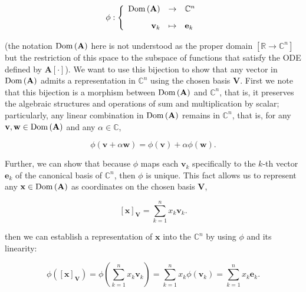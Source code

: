 \begin{equation} \phi: \left\{\begin{array}{rcl} \operatorname{Dom}\left(\mathbf{A}\right) &\to& \mathbb{C}^n \\[3mm] \mathbf{v}_k &\mapsto& \mathbf{e}_k \end{array}\right. \end{equation}

	\noindent (the notation $\operatorname{Dom}\left(\mathbf{A}\right)$ here is not understood as the proper domain $\left[\mathbb{R}\to\mathbb{C}^n\right]$ but the restriction of this space to the subspace of functions that satisfy the ODE defined by $\mathbf{A}\left[\cdot\right]$). We want to use this bijection to show that any vector in $\operatorname{Dom}\left(\mathbf{A}\right)$ admits a representation in $\mathbb{C}^n$ using the chosen basis $\mathbf{V}$. First we note that this bijection is a morphism between $\operatorname{Dom}\left(\mathbf{A}\right)$ and $\mathbb{C}^n$, that is, it preserves the algebraic structures and operations of sum and multiplication by scalar; particularly, any linear combination in $\operatorname{Dom}\left(\mathbf{A}\right)$ remains in $\mathbb{C}^n$, that is, for any $\mathbf{v},\mathbf{w}\in\operatorname{Dom}\left(\mathbf{A}\right)$ and any $\alpha\in\mathbb{C}$,

\begin{equation} \phi\left(\mathbf{v} + \alpha\mathbf{w}\right) = \phi\left(\mathbf{v}\right) + \alpha\phi\left(\mathbf{w}\right) .\end{equation}

	Further, we can show that because $\phi$ maps each $\mathbf{v}_k$ specifically to the $k$-th vector $\mathbf{e}_k$ of the canonical basis of $\mathbb{C}^n$, then $\phi$ is unique. This fact allows us to represent any $\mathbf{x}\in\operatorname{Dom}\left(\mathbf{A}\right)$ as coordinates on the chosen basis $\mathbf{V}$,

\begin{equation} \left[\mathbf{x}\right]_{\mathbf{V}} = \sum\limits_{k=1}^n x_k \mathbf{v}_k .\end{equation}

	\noindent then we can establish a representation of $\mathbf{x}$ into the $\mathbb{C}^n$ by using $\phi$ and its linearity:

\begin{equation} \phi\left(\left[\mathbf{x}\right]_{\mathbf{V}}\right) = \phi\left(\sum\limits_{k=1}^n x_k \mathbf{v}_k\right) = \sum\limits_{k=1}^n x_k \phi\left(\mathbf{v}_k\right) = \sum\limits_{k=1}^n x_k \mathbf{e}_k .\end{equation}


